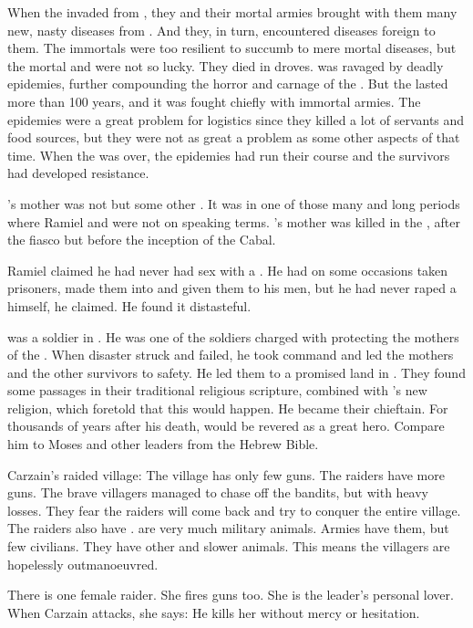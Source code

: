When the \resphain invaded from \Nyx, they and their mortal armies brought with them many new, nasty diseases from \Nyx.
And they, in turn, encountered \Tembraean diseases foreign to them.
The immortals were too resilient to succumb to mere mortal diseases, but the mortal \Tembraeans and \Nyxians were not so lucky.
They died in droves.
\Tembrae was ravaged by deadly epidemies, further compounding the horror and carnage of the \secondbanewar.
But the \secondbanewar lasted more than 100 years, and it was fought chiefly with immortal armies.
The epidemies were a great problem for logistics since they killed a lot of servants and food sources, but they were not as great a problem as some other aspects of that time.
When the \secondbanewar was over, the epidemies had run their course and the survivors had developed resistance.

\Cishiel's mother was not \Shiaraid but some other \resvil.
It was in one of those many and long periods where Ramiel and \Shiaraid were not on speaking terms.
\Cishiel's mother was killed in the \resphanwars, after the \malach fiasco but before the inception of the Cabal.

Ramiel claimed he had never had sex with a \jurid.
He had on some occasions taken prisoners, made them into \jurideth and given them to his men, but he had never raped a \jurid himself, he claimed.
He found it distasteful.

\Morza was a \nephil soldier in \Numah.
He was one of the soldiers charged with protecting the mothers of the \resphain.
When disaster struck and \Thanatzil failed, he took command and led the mothers and the other survivors to safety.
He led them to a promised land in \Nyx.
They found some passages in their traditional religious scripture, combined with \Semiza's new \bane religion, which foretold that this would happen.
He became their chieftain.
For thousands of years after his death, \Morza would be revered as a great hero.
Compare him to Moses and other leaders from the Hebrew Bible.

Carzain's raided village:
The village has only few guns.
The raiders have more guns.
The brave villagers managed to chase off the bandits, but with heavy losses.
They fear the raiders will come back and try to conquer the entire village.
The raiders also have \relcs.
\Relcs are very much military animals.
Armies have them, but few civilians. 
They have other and slower animals.
This means the villagers are hopelessly outmanoeuvred.

There is one female raider.
She fires guns too.
She is the leader's personal lover.
When Carzain attacks, she says: 
He kills her without mercy or hesitation.



